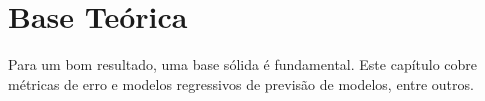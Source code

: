 \section{Base Te\'orica}\label{sec:base}

Para um bom resultado, uma base sólida é fundamental. Este capítulo cobre métricas de erro e modelos regressivos de previsão de modelos, entre outros.







